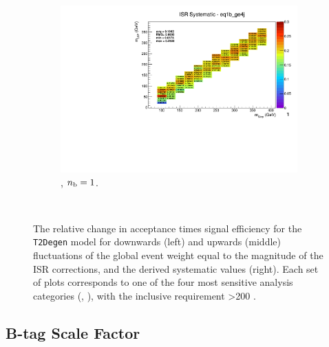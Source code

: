 \begin{figure}[ht!]
\begin{subfigure}[b]{0.32\textwidth}
    \includegraphics[width=\textwidth, page=1]{Figs/sms/t2degen/v19_2/systs/T2_4body_ISR_eq1b_ge4j.pdf}
    \caption{\njhigh, $n_{\text{b}} = 1$.}
  \end{subfigure}\\
  \caption{The relative change in acceptance times signal efficiency for the
  \texttt{T2Degen} model for downwards (left) and upwards (middle) fluctuations
  of the global event weight equal to the magnitude of the ISR corrections,
  and the derived systematic values (right). Each set of plots corresponds
  to one of the four most sensitive analysis categories (\nb, \nj), with the
  inclusive requirement \HT>200 \gev.}
  \label{fig:sms-isr-t2degen}
\end{figure}


\newpage
\subsection*{B-tag Scale Factor}
\label{sec:t2degen_btag_plots}

